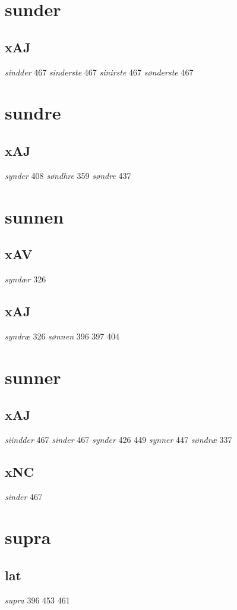 \documentclass[a4paper,twocolumn]{article}
\begin{document}
\section{sunder}
\label{sec:org1283053}
\subsection{xAJ}
\label{sec:org112f651}
\emph{sindder} 467 \emph{sinderste} 467 \emph{sinirste} 467 \emph{sønderste} 467 
\section{sundre}
\label{sec:org3a6f179}
\subsection{xAJ}
\label{sec:org60d35bd}
\emph{synder} 408 \emph{søndhre} 359 \emph{søndre} 437 
\section{sunnen}
\label{sec:org5c572e1}
\subsection{xAV}
\label{sec:org55ce21f}
\emph{syndær} 326 
\subsection{xAJ}
\label{sec:orgfe17cea}
\emph{syndræ} 326 \emph{sønnen} 396 397 404 
\section{sunner}
\label{sec:orge5ae0ba}
\subsection{xAJ}
\label{sec:org8e186bd}
\emph{siindder} 467 \emph{sinder} 467 \emph{synder} 426 449 \emph{synner} 447 \emph{søndræ} 337 
\subsection{xNC}
\label{sec:org9d6109e}
\emph{sinder} 467 
\section{supra}
\label{sec:org382255f}
\subsection{lat}
\label{sec:orga6f6205}
\emph{supra} 396 453 461 
\end{document}
